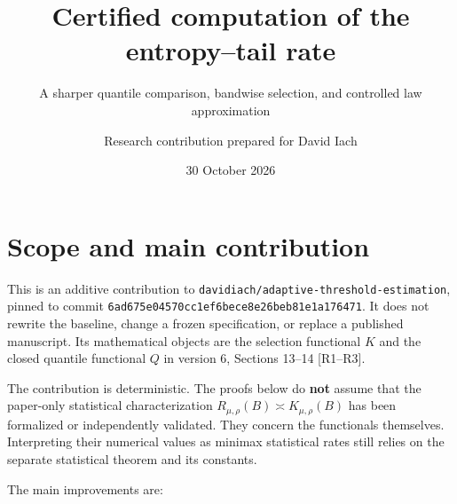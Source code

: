 \documentclass[
  11pt,
  a4paper,
]{article}
\title{Certified computation of the entropy--tail rate}
\subtitle{A sharper quantile comparison, bandwise selection, and
controlled law approximation}
\author{Research contribution prepared for David Iach}
\date{30 October 2026}
\begin{document}
\maketitle

\section{Scope and main contribution}\label{scope-and-main-contribution}

This is an additive contribution to
\texttt{davidiach/adaptive-threshold-estimation}, pinned to commit
\texttt{6ad675e04570cc1ef6bece8e26beb81e1a176471}. It does not rewrite
the baseline, change a frozen specification, or replace a published
manuscript. Its mathematical objects are the selection functional \(K\)
and the closed quantile functional \(Q\) in version 6, Sections 13--14
{[}R1--R3{]}.

The contribution is deterministic. The proofs below do \textbf{not}
assume that the paper-only statistical characterization
\(R_{\mu,\rho}(B)\asymp K_{\mu,\rho}(B)\) has been formalized or
independently validated. They concern the functionals themselves.
Interpreting their numerical values as minimax statistical rates still
relies on the separate statistical theorem and its constants.

The main improvements are:
\end{document}
